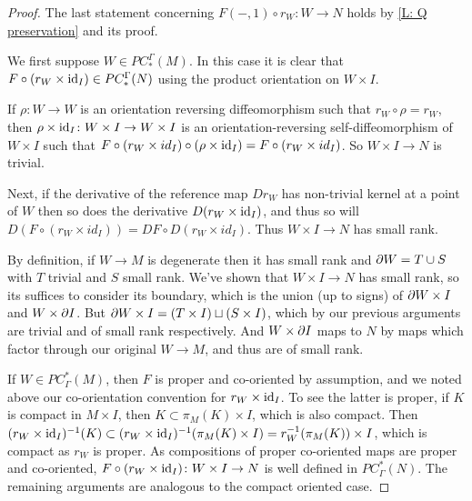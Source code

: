 \begin{proof}
	The last statement concerning $F(-,1) \circ r_W \colon W \to N$ holds by \cref{L: Q preservation} and its proof.

	We first suppose $W \in PC_*^\Gamma(M)$.
	In this case it is clear that $F \circ (r_W \times \mathrm{id}_I) \in PC_*^\Gamma(N)$ using the product orientation on $W \times I$.

	If $\rho \colon W \to W$ is an orientation reversing diffeomorphism such that $r_W \circ \rho = r_W$, then
	$\rho \times \mathrm{id}_I \colon W \times I \to W \times I$ is an orientation-reversing self-diffeomorphism of $W \times I$ such that $F \circ (r_W \times id_I) \circ (\rho \times \mathrm{id}_I) = F \circ (r_W \times id_I)$.
	So $W \times I \to N$ is trivial.

	Next, if the derivative of the reference map $Dr_W$ has non-trivial kernel at a point of $W$ then so does
	the derivative $D(r_W \times \mathrm{id}_I)$, and thus so
	will $D(F \circ (r_W \times id_I)) = DF \circ D(r_W \times id_I)$.
	Thus $W \times I \to N$ has small rank.

	By definition, if $W \to M$ is degenerate then it has small rank and $\partial W = T \cup S$ with $T$ trivial and $S$ small rank.
	We've shown that $W \times I \to N$ has small rank, so its suffices to consider its boundary,
	which is the union (up to signs) of $\partial W \times I$ and $W \times \partial I$.
	But $\partial W \times I = (T \times I) \sqcup (S \times I)$, which by our previous
	arguments are trivial and of small rank respectively.
	And $W \times \partial I$ maps to $N$ by maps which factor through our original $W \to M$,
	and thus are of small rank.

	If $W \in PC^*_\Gamma(M)$, then $F$ is proper and co-oriented by assumption, and we noted above our co-orientation convention for $r_W \times \mathrm{id}_I$.
	To see the latter is proper, if $K$ is compact in $M \times I$, then $K \subset \pi_M(K) \times I$, which is also compact.
	Then $(r_W \times \mathrm{id}_I)^{-1}(K) \subset (r_W \times \mathrm{id}_I)^{-1}(\pi_M(K) \times I) = r_W^{-1}(\pi_M(K)) \times I$, which is compact as $r_W$ is proper.
	As compositions of proper co-oriented maps are proper and co-oriented, $F \circ (r_W \times \mathrm{id}_I) \colon W \times I \to N$ is well defined in $PC^*_\Gamma(N)$.
	The remaining arguments are analogous to the compact oriented case.
\end{proof}

